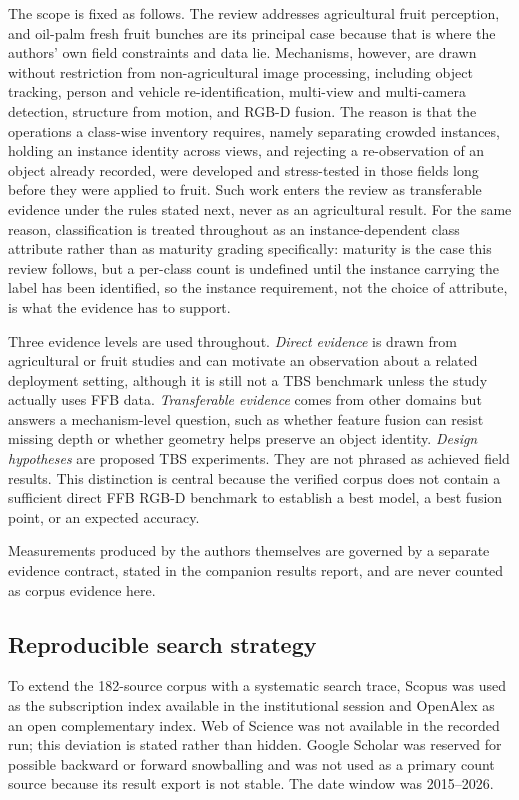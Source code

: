 The scope is fixed as follows. The review addresses agricultural fruit perception, and oil-palm fresh fruit bunches are its principal case because that is where the authors' own field constraints and data lie. Mechanisms, however, are drawn without restriction from non-agricultural image processing, including object tracking, person and vehicle re-identification, multi-view and multi-camera detection, structure from motion, and RGB-D fusion. The reason is that the operations a class-wise inventory requires, namely separating crowded instances, holding an instance identity across views, and rejecting a re-observation of an object already recorded, were developed and stress-tested in those fields long before they were applied to fruit. Such work enters the review as transferable evidence under the rules stated next, never as an agricultural result. For the same reason, classification is treated throughout as an instance-dependent class attribute rather than as maturity grading specifically: maturity is the case this review follows, but a per-class count is undefined until the instance carrying the label has been identified, so the instance requirement, not the choice of attribute, is what the evidence has to support.

Three evidence levels are used throughout. \textit{Direct evidence} is drawn from agricultural or fruit studies and can motivate an observation about a related deployment setting, although it is still not a TBS benchmark unless the study actually uses FFB data. \textit{Transferable evidence} comes from other domains but answers a mechanism-level question, such as whether feature fusion can resist missing depth or whether geometry helps preserve an object identity. \textit{Design hypotheses} are proposed TBS experiments. They are not phrased as achieved field results. This distinction is central because the verified corpus does not contain a sufficient direct FFB RGB-D benchmark to establish a best model, a best fusion point, or an expected accuracy.

Measurements produced by the authors themselves are governed by a separate evidence contract, stated in the companion results report, and are never counted as corpus evidence here.

\subsection{Reproducible search strategy}

To extend the 182-source corpus with a systematic search trace, Scopus was used as the subscription index available in the institutional session and OpenAlex as an open complementary index. Web of Science was not available in the recorded run; this deviation is stated rather than hidden. Google Scholar was reserved for possible backward or forward snowballing and was not used as a primary count source because its result export is not stable. The date window was 2015--2026.

